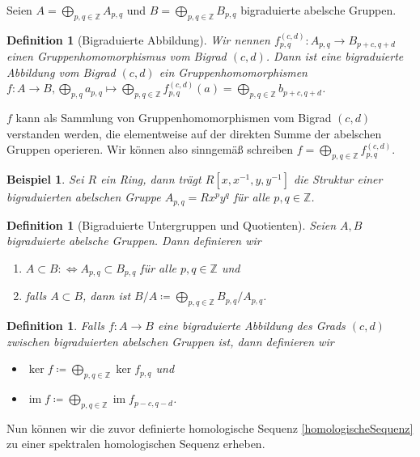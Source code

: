 \documentclass[12pt, hidelinks]{article}
\numberwithin{conj}{section}
\newtheorem{definition}[conj]{Definition}
\newtheorem{example}[conj]{Beispiel}
\newcommand{\Z}{\mathbb{Z}}
\newcommand{\ima}{\operatorname{im}}
\begin{document}
Seien $A = \bigoplus_{p,q \in \Z} A_{p,q}$ und $B = \bigoplus_{p,q \in \Z} B_{p,q}$ bigraduierte abelsche Gruppen. 

\begin{definition}[Bigraduierte Abbildung]
    Wir nennen $f^{(c,d)}_{p,q}: A_{p,q} \to B_{p+c,q+d}$ einen Gruppenhomomorphismus vom Bigrad $(c,d)$. Dann ist eine bigraduierte Abbildung vom Bigrad $(c,d)$ ein  Gruppenhomomorphismen $f: A \to B, \bigoplus_{p,q} a_{p,q} \mapsto \bigoplus_{p,q \in \Z} f^{(c,d)}_{p,q}(a) = \bigoplus_{p,q \in \Z} b_{p+c,q+d}$.
\end{definition}

$f$ kann als Sammlung von Gruppenhomomorphismen vom Bigrad $(c,d)$ verstanden werden, die elementweise auf der direkten Summe der abelschen Gruppen operieren. Wir können also sinngemäß schreiben $f = \bigoplus_{p,q \in \Z} f^{(c,d)}_{p,q}$.

\begin{example}
    Sei $R$ ein Ring, dann trägt $R[x,x^{-1},y,y^{-1}]$ die Struktur einer bigraduierten abelschen Gruppe $A_{p,q} = Rx^py^q$ für alle $p,q \in \Z$.
\end{example}

\begin{definition}[Bigraduierte Untergruppen und Quotienten]
    Seien $A,B$ bigraduierte abelsche Gruppen. Dann definieren wir
    \begin{enumerate}
        \item $A \subset B \colon\Leftrightarrow A_{p,q} \subset B_{p,q}$ für alle $p,q \in \Z$ und
        \item falls $A \subset B$, dann ist $B/A \coloneq \bigoplus_{p,q \in \Z} B_{p,q}/A_{p,q}$.
    \end{enumerate}
\end{definition}

\begin{definition}
    Falls $f: A \to B$ eine bigraduierte Abbildung des Grads $(c,d)$ zwischen bigraduierten abelschen Gruppen ist, dann definieren wir
    \begin{itemize}[nolistsep]
        \item $\ker f \coloneq \bigoplus_{p,q \in \Z} \ker f_{p,q}$ und
        \item $\ima f \coloneq \bigoplus_{p,q \in \Z} \ima f_{p-c,q-d}$.
    \end{itemize}
\end{definition}

Nun können wir die zuvor definierte homologische Sequenz \ref{homologischeSequenz} zu einer spektralen homologischen Sequenz erheben.
\end{document}
